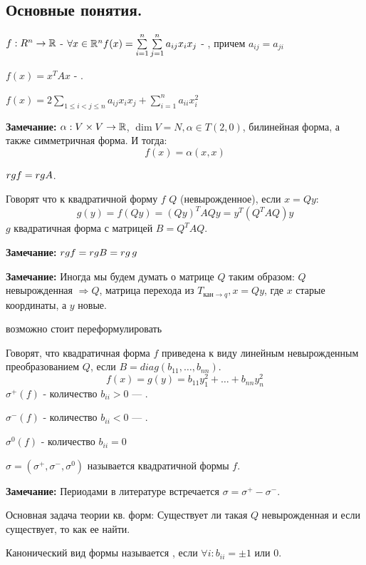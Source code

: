 \subsection{Основные понятия.}

 $f: R^n  \rightarrow \mathbb{R}$ - $\forall x \in \mathbb{R}^n f(x)= \sum\limits_{i=1}^n \sum\limits_{j=1}^n a_{ij}x_ix_j$ - , причем $a_{ij} = a_{ji}$

$f(x) = x^T A x$ - .

$f(x) = 2 \sum\limits_{1 \leq i < j \leq n}a_{ij} x_i x_j + \sum\limits_{i=1}^n a_{ii}x_i^2$

\textbf{Замечание:} $\alpha: V \times V \rightarrow \mathbb{R}$, $\dim V = N, \alpha \in T(2,0)$, билинейная форма, а также симметричная форма. И тогда:
$$f(x) = \alpha(x,x)$$

 $rg f = rg A$.

 Говорят что к квадратичной форму $f$  $Q$ (невырожденное), если $x = Qy$:
$$g(y) = f(Qy) = (Qy)^T A Qy =  y^T (Q^TAQ)y$$
$g$ квадратичная форма с матрицей $B = Q^TAQ$.

\textbf{Замечание:} $rg f =rg B = rg \, g$

\textbf{Замечание:} Иногда мы будем думать о матрице $Q$ таким образом: $Q$ невырожденная $\Rightarrow Q$, матрица перехода из $T_{\text{кан}\rightarrow q}, x = Qy$, где $x$ старые координаты, а $y$ новые.

возможно стоит переформулировать

 Говорят, что квадратичная форма $f$ приведена к  виду линейным невырожденным преобразованием $Q$, если $B  = diag(b_{11},\ldots, b_{nn})$.
$$f(x) = g(y) = b_{11}y_1^2 + \ldots + b_{nn}y_n^2$$
$\sigma^+(f)$ - количество $b_{ii}>0$ --- .

$\sigma^-(f)$ - количество $b_{ii}<0$ --- .

$\sigma^0(f)$ - количество $b_{ii}=0$

$\sigma = (\sigma^+, \sigma^-, \sigma^0)$ называется  квадратичной формы $f$.

\textbf{Замечание:} Периодами в литературе встречается $\sigma = \sigma^+ - \sigma^-$.

Основная задача теории кв. форм: Существует ли такая $Q$ невырожденная и если существует, то как ее найти.

 Канонический вид формы называется , если $\forall i : b_{ii} = \pm 1$ или 0.

